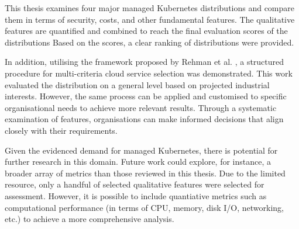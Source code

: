 This thesis examines four major managed Kubernetes distributions and compare them in terms of security, costs, and other fundamental features. The qualitative features are quantified and combined to reach the final evaluation scores of the distributions Based on the scores, a clear ranking of distributions were provided.

In addition, utilising the framework proposed by Rehman et al. \cite{5976164}, a structured procedure for multi-criteria cloud service selection was demonstrated. This work evaluated the distribution on a general level based on projected industrial interests. However, the same process can be applied and customised to specific organisational needs to achieve more relevant results. Through a systematic examination of features, organisations can make informed decisions that align closely with their requirements.

Given the evidenced demand for managed Kubernetes, there is potential for further research in this domain. Future work could explore, for instance, a broader array of metrics than those reviewed in this thesis. Due to the limited resource, only a handful of selected qualitative features were selected for assessment. However, it is possible to include quantiative metrics such as computational performance (in terms of CPU, memory, disk I/O, networking, etc.) to achieve a more comprehensive analysis.





















